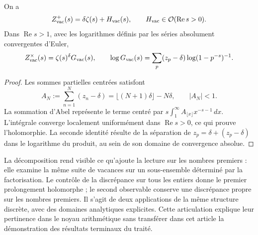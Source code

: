\begin{proposition}
On a
\[
 Z_{\rm vac}^{+}(s)=\delta\zeta(s)+H_{\rm vac}(s),
 \qquad H_{\rm vac}\in\mathcal O(\operatorname{Re}s>0).
\]
Dans \(\operatorname{Re}s>1\), avec les logarithmes définis par les séries absolument convergentes d'Euler,
\[
 Z_{\rm vac}^{\times}(s)=\zeta(s)^\delta G_{\rm vac}(s),\qquad
 \log G_{\rm vac}(s)=
 \sum_p(z_p-\delta)\log(1-p^{-s})^{-1}.
\]
\end{proposition}
\begin{proof}
Les sommes partielles centrées satisfont
\[
 A_N:=\sum_{n=1}^N(z_n-\delta)
 =\lfloor(N+1)\delta\rfloor-N\delta,\qquad |A_N|<1.
\]
La sommation d'Abel représente le terme centré par \(s\int_1^\infty A_{\lfloor x\rfloor}x^{-s-1}\,dx\). L'intégrale converge localement uniformément dans \(\operatorname{Re}s>0\), ce qui prouve l'holomorphie. La seconde identité résulte de la séparation de \(z_p=\delta+(z_p-\delta)\) dans le logarithme du produit, au sein de son domaine de convergence absolue.
\end{proof}

La décomposition rend visible ce qu'ajoute la lecture sur les nombres premiers : elle examine
la même suite de vacances sur un sous-ensemble déterminé par la
factorisation. Le contrôle de la discrépance sur tous les entiers donne
le premier prolongement holomorphe ; le second observable conserve une
discrépance propre sur les nombres premiers. Il s'agit de deux applications de la même
structure discrète, avec des domaines analytiques explicites. Cette articulation
explique leur pertinence dans le noyau arithmétique sans transférer dans cet
article la démonstration des résultats terminaux du traité.
